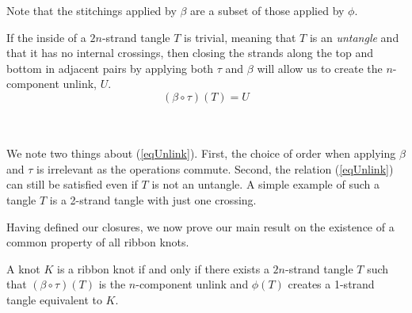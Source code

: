 \documentclass{ws-jktr}
\begin{document}
Note that the stitchings applied by $\beta$ are a subset of those applied by
$\phi$.

If the inside of a $2n$-strand tangle $T$ is trivial, meaning that $T$ is an
\textit{untangle} and that it has no internal crossings, then closing the
strands along the top and bottom in adjacent pairs by applying both $\tau$ and
$\beta$ will allow us to create the $n$-component unlink, $U$.\\

\noindent
\begin{equation}
(\beta\circ\tau)(T)=U
\label{eqUnlink}
\end{equation}\\

\begin{paperwhere}
\end{paperwhere}\\

We note two things about (\ref{eqUnlink}).
First, the choice of order when applying $\beta$ and $\tau$ is irrelevant as the
operations commute.
Second, the relation (\ref{eqUnlink}) can still be satisfied even if $T$ is not an
untangle.
A simple example of such a tangle $T$ is a 2-strand tangle with just one
crossing.

Having defined our closures, we now prove our main result on the existence of a
common property of all ribbon knots.

\begin{theorem}
A knot $K$ is a ribbon knot if and only if there exists a $2n$-strand tangle
$T$ such that $(\beta\circ\tau)(T)$ is the $n$-component unlink and $\phi(T)$
creates a 1-strand tangle equivalent to $K$.
\end{theorem}
\end{document}
